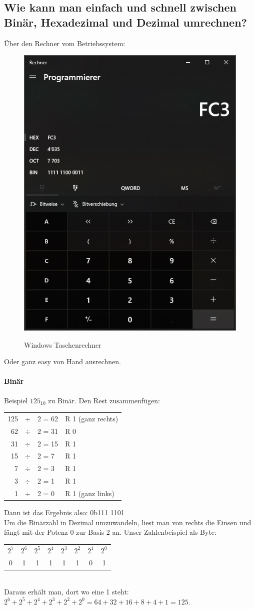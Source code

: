 \subsection*{Wie kann man einfach und schnell zwischen Binär, Hexadezimal und Dezimal umrechnen?}\label{sub:RechnenBinHexDez}
    Über den Rechner vom Betriebssystem:
    \begin{figure}[H]
        \begin{center}
        \label{pic:calc}
        \includegraphics[width=.5\textwidth]{images/calc.jpg}
        \caption{Windows Taschenrechner}
        \end{center}
    \end{figure}
    Oder ganz easy von Hand ausrechnen.
    \paragraph{Binär}Beispiel $125_{10}$ zu Binär. Den Rest zusammenfügen:\\
    \begin{tabular}{rcll}
        125&$\div$&2 = 62&R 1 (ganz rechts)\\
        62&$\div$&2 = 31&R 0\\
        31&$\div$&2 = 15&R 1\\
        15&$\div$&2 = 7&R 1\\
        7&$\div$&2 = 3&R 1\\
        3&$\div$&2 = 1&R 1\\
        1&$\div$&2 = 0&R 1 (ganz links)\\[1em]
\end{tabular}
Dann ist das Ergebnis also: 0b111 1101\\[1em]
Um die Binärzahl in Dezimal umzuwandeln, liest man von rechts die Einsen und fängt mit der Potenz 0 zur Basis 2 an. Unser Zahlenbeispiel als Byte:\\[1em]
\begin{tabular}{cccccccc}
    $2^7$&$2^6$&$2^5$&$2^4$&$2^3$&$2^2$&$2^1$&$2^0$\\
    0&1&1&1&1&1&0&1\\
\end{tabular}\\[1em]
Daraus erhält man, dort wo eine 1 steht:\\$2^6+2^5+2^4+2^3+2^2+2^0=64+32+16+8+4+1=125$.

